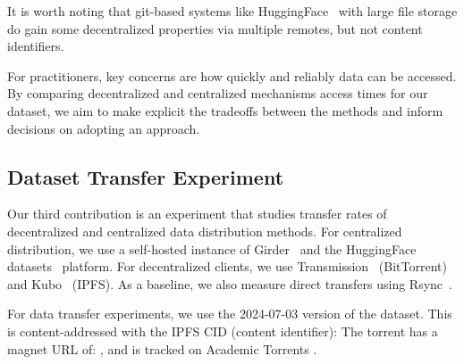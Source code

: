\documentclass{article}
\begin{document}
It is worth noting that git-based \cite{chacon2014progit} systems like
  HuggingFace~\cite{huggingface_datasets} with large file storage do gain some decentralized
  properties via multiple remotes, but not content identifiers.

For practitioners, key concerns are how quickly and reliably data can be accessed.
By comparing decentralized and centralized mechanisms access times for our dataset, we aim to make
  explicit the tradeoffs between the methods and inform decisions on adopting an approach.



\subsection{Dataset Transfer Experiment}

Our third contribution is an experiment that studies transfer rates of decentralized and centralized data
  distribution methods.
For centralized distribution, we use a self-hosted instance of Girder~\cite{girder_2024} and the HuggingFace
  datasets~\cite{huggingface_datasets} platform.
For decentralized clients, we use Transmission~\cite{transmission_2024} (BitTorrent) and
  Kubo~\cite{ipfskubo_2024} (IPFS).
As a baseline, we also measure direct transfers using Rsync~\cite{rsyncprojectrsync_2024}.

For data transfer experiments, we use the 2024-07-03 version of the dataset. 
This is content-addressed with the IPFS CID (content identifier):
\texttt{}
The torrent has a magnet URL of:
\texttt{},
and is tracked on Academic Torrents \cite{academic_torrents_Cohen2014}.
\end{document}
